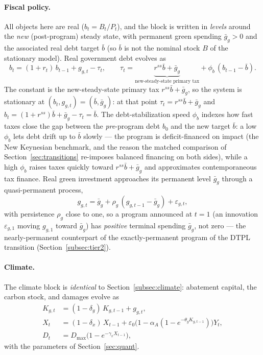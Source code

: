 \documentclass[12pt]{article}
\begin{document}
\paragraph{Fiscal policy.} All objects here are real ($b_t=B_t/P_t$), and the
block is written in \emph{levels} around the \emph{new} (post-program) steady
state, with permanent green spending $\bar g_g>0$ and the associated real debt
target $\bar b$ (so $\bar b$ is not the nominal stock $B$ of the stationary
model). Real government debt evolves as
\begin{equation}
b_t = (1+r_t)\,b_{t-1} + g_{g,t} - \tau_t, \qquad
\tau_t = \underbrace{r^{ss}\bar b + \bar g_g}_{\text{new-steady-state primary tax}}
        + \phi_b\,(b_{t-1}-\bar b).
\label{eq:nk-fiscal}
\end{equation}
The constant is the new-steady-state primary tax $r^{ss}\bar b+\bar g_g$, so the
system is stationary at $(b_t,g_{g,t})=(\bar b,\bar g_g)$: at that point
$\tau_t=r^{ss}\bar b+\bar g_g$ and $b_t=(1+r^{ss})\bar b+\bar g_g-\tau_t=\bar b$.
The debt-stabilization speed $\phi_b$ indexes
how fast taxes close the gap between the \emph{pre}-program debt $b_0$ and the
new target $\bar b$: a low $\phi_b$ lets debt drift up to $\bar b$ slowly ---
the program is deficit-financed on impact (the New Keynesian benchmark,
and the reason the matched comparison of Section~\ref{sec:transitions}
re-imposes balanced financing on both sides), while a high
$\phi_b$ raises taxes quickly toward $r^{ss}\bar b+\bar g_g$ and approximates
contemporaneous tax finance. Real green investment approaches its permanent
level $\bar g_g$ through a quasi-permanent process,
\begin{equation}
g_{g,t} = \bar g_g + \rho_g\,(g_{g,t-1}-\bar g_g) + \varepsilon_{g,t},
\label{eq:nk-program}
\end{equation}
with persistence $\rho_g$ close to one, so a program announced at $t=1$
(an innovation $\varepsilon_{g,1}$ moving $g_{g,1}$ toward $\bar g_g$) has
\emph{positive} terminal spending $\bar g_g$, not zero --- the nearly-permanent
counterpart of the exactly-permanent program of the DTPL transition
(Section~\ref{subsec:tier2}).

\paragraph{Climate.} The climate block is \emph{identical} to
Section~\ref{subsec:climate}: abatement capital, the carbon stock, and
damages evolve as
\begin{align}
K_{g,t} &= (1-\delta_g)\,K_{g,t-1} + g_{g,t}, \label{eq:nk-kg}\\
X_t &= (1-\delta_x)\,X_{t-1}
      + \varepsilon_0\bigl(1-\alpha_A(1-e^{-\theta_g K_{g,t-1}})\bigr)Y_t,
      \label{eq:nk-carbon}\\
D_t &= D_{\max}\bigl(1-e^{-\gamma_x X_{t-1}}\bigr),
      \label{eq:nk-damages}
\end{align}
with the parameters of Section~\ref{sec:quant}.
\end{document}
